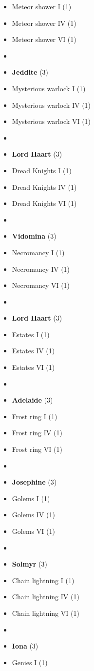 \begin{multicols}{3}
\begin{itemize}[leftmargin=0pt, label={}, noitemsep]
  \item Meteor shower I (1)
  \item Meteor shower IV (1)
  \item Meteor shower VI (1)
  \item
  \item \textbf{Jeddite} (3)
  \item Mysterious warlock I (1)
  \item Mysterious warlock IV (1)
  \item Mysterious warlock VI (1)
  \item
  \item \textbf{Lord Haart} (3)
  \item Dread Knights I (1)
  \item Dread Knights IV (1)
  \item Dread Knights VI (1)
  \item
  \item \textbf{Vidomina} (3)
  \item Necromancy I (1)
  \item Necromancy IV (1)
  \item Necromancy VI (1)
  \item
  \item \textbf{Lord Haart} (3)
  \item Estates I (1)
  \item Estates IV (1)
  \item Estates VI (1)
  \item
  \item \textbf{Adelaide} (3)
  \item Frost ring I (1)
  \item Frost ring IV (1)
  \item Frost ring VI (1)
  \item
  \item \textbf{Josephine} (3)
  \item Golems I (1)
  \item Golems IV (1)
  \item Golems VI (1)
  \item
  \item \textbf{Solmyr} (3)
  \item Chain lightning I (1)
  \item Chain lightning IV (1)
  \item Chain lightning VI (1)
  \item
  \item \textbf{Iona} (3)
  \item Genies I (1)

\end{itemize}
\end{multicols}
